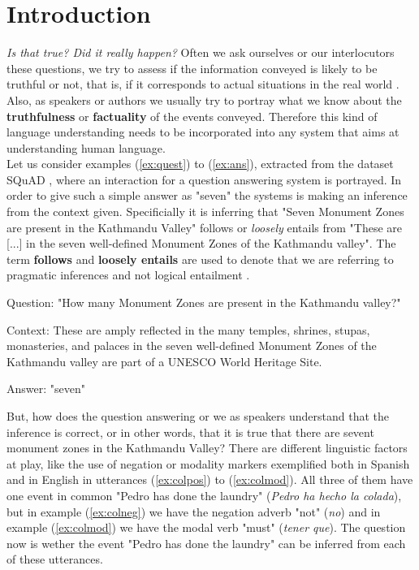 \label{chap:intr}
\section{Introduction}
\textit{Is that true? Did it really happen?} Often we ask ourselves or our interlocutors these questions, we try to assess if the information conveyed is likely to be truthful or not, that is, if it corresponds to actual situations in the real world \citep{sauri2009factbank}. Also, as speakers or authors we usually try to portray what we know about the \textbf{truthfulness} or \textbf{factuality} of the events conveyed. Therefore this kind of language understanding needs to be incorporated into any system that aims at understanding human language.\\

Let us consider examples (\ref{ex:quest}) to (\ref{ex:ans}), extracted from the dataset SQuAD \citep{rajpurkar2016squad}, where an interaction for a question answering system is portrayed. In order to give such a simple answer as "seven" the systems is making an inference from the context given. Specificially it is inferring that "Seven Monument Zones are present in the Kathmandu Valley" follows or \textit{loosely} entails from "These are [...] in the seven well-defined Monument Zones of the Kathmandu valley". The term \textbf{follows} and \textbf{loosely entails} are used to denote that we are referring to pragmatic inferences and not logical entailment \citep{manning2006local}.\\ 

\begin{exe}
        \ex\label{ex:quest}
        \begin{xlist}
                \item Question: "How many Monument Zones are present in the Kathmandu valley?" \label{ex:quest}
                \item Context: These are amply reflected in the many temples, shrines, stupas, monasteries, and palaces in the seven well-defined Monument Zones of the Kathmandu valley are part of a UNESCO World Heritage Site.\label{ex:cont}
                \item Answer: "seven"\label{ex:ans}
        \end{xlist}
\end{exe}

But, how does the question answering or we as speakers understand that the inference is correct, or in other words, that it is true that there are sevent monument zones in the Kathmandu Valley? There are different linguistic factors at play, like the use of negation or modality markers exemplified both in Spanish and in English in utterances (\ref{ex:colpos}) to (\ref{ex:colmod}). All three of them have one event in common "Pedro has done the laundry" (\textit{Pedro ha hecho la colada}), but in example (\ref{ex:colneg}) we have the negation adverb "not" (\textit{no}) and in example (\ref{ex:colmod}) we have the modal verb "must" (\textit{tener que}). The question now is wether the event "Pedro has done the laundry" can be inferred from each of these utterances.\\

